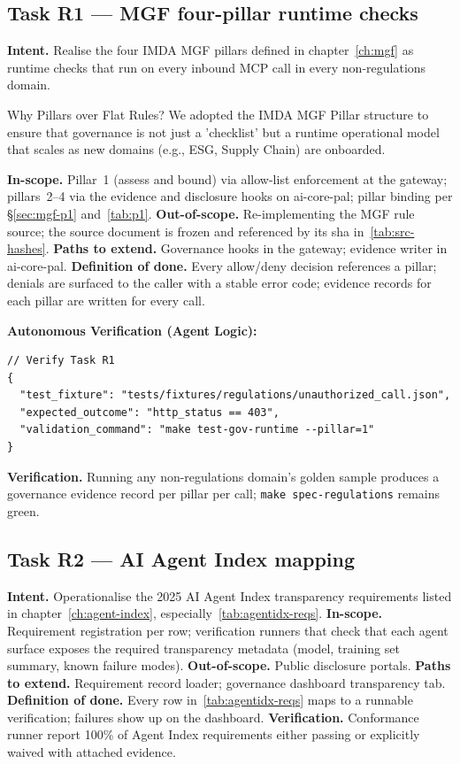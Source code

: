 \subsection*{Task R1 --- MGF four-pillar runtime checks}
\textbf{Intent.} Realise the four IMDA MGF pillars defined in
chapter~\ref{ch:mgf} as runtime checks that run on every inbound MCP
call in every non-regulations domain.

\begin{adrbox}{Why Pillars over Flat Rules?}
We adopted the IMDA MGF Pillar structure to ensure that governance is not just a 'checklist' but a runtime operational model that scales as new domains (e.g., ESG, Supply Chain) are onboarded.
\end{adrbox}

\textbf{In-scope.} Pillar~1 (assess and bound) via allow-list
enforcement at the gateway; pillars~2--4 via the evidence and
disclosure hooks on ai-core-pal; pillar binding per
\S\ref{sec:mgf-p1} and~\ref{tab:p1}.
\textbf{Out-of-scope.} Re-implementing the MGF rule source; the
source document is frozen and referenced by its sha in~\ref{tab:src-hashes}.
\textbf{Paths to extend.} Governance hooks in the gateway; evidence
writer in ai-core-pal.
\textbf{Definition of done.} Every allow/deny decision references a
pillar; denials are surfaced to the caller with a stable error code;
evidence records for each pillar are written for every call.

\textbf{Autonomous Verification (Agent Logic):}
\begin{lstlisting}[language=jsonx]
// Verify Task R1
{
  "test_fixture": "tests/fixtures/regulations/unauthorized_call.json",
  "expected_outcome": "http_status == 403",
  "validation_command": "make test-gov-runtime --pillar=1"
}
\end{lstlisting}

\textbf{Verification.} Running any non-regulations domain's golden
sample produces a governance evidence record per pillar per call;
\texttt{make spec-regulations} remains green.

\subsection*{Task R2 --- AI Agent Index mapping}
\textbf{Intent.} Operationalise the 2025 AI Agent Index
transparency requirements listed in chapter~\ref{ch:agent-index},
especially~\ref{tab:agentidx-reqs}.
\textbf{In-scope.} Requirement registration per row; verification
runners that check that each agent surface exposes the required
transparency metadata (model, training set summary, known failure
modes).
\textbf{Out-of-scope.} Public disclosure portals.
\textbf{Paths to extend.} Requirement record loader; governance
dashboard transparency tab.
\textbf{Definition of done.} Every row in~\ref{tab:agentidx-reqs}
maps to a runnable verification; failures show up on the dashboard.
\textbf{Verification.} Conformance runner report 100\% of Agent
Index requirements either passing or explicitly waived with
attached evidence.

